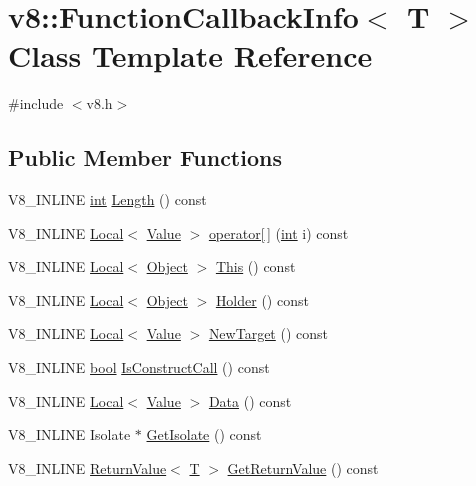 \hypertarget{classv8_1_1FunctionCallbackInfo}{}\section{v8\+:\+:Function\+Callback\+Info$<$ T $>$ Class Template Reference}
\label{classv8_1_1FunctionCallbackInfo}


{\ttfamily \#include $<$v8.\+h$>$}

\subsection*{Public Member Functions}
\begin{DoxyCompactItemize}
\item 
V8\+\_\+\+I\+N\+L\+I\+NE \mbox{\hyperlink{classint}{int}} \mbox{\hyperlink{classv8_1_1FunctionCallbackInfo_af97dd3f1cb01ed039f9479152ad63a84}{Length}} () const
\item 
V8\+\_\+\+I\+N\+L\+I\+NE \mbox{\hyperlink{classv8_1_1Local}{Local}}$<$ \mbox{\hyperlink{classv8_1_1Value}{Value}} $>$ \mbox{\hyperlink{classv8_1_1FunctionCallbackInfo_a77dce5cad7b198c4181a522e9e0ab10f}{operator\mbox{[}$\,$\mbox{]}}} (\mbox{\hyperlink{classint}{int}} i) const
\item 
V8\+\_\+\+I\+N\+L\+I\+NE \mbox{\hyperlink{classv8_1_1Local}{Local}}$<$ \mbox{\hyperlink{classv8_1_1Object}{Object}} $>$ \mbox{\hyperlink{classv8_1_1FunctionCallbackInfo_a4ddfd6d21732dff1c4c55d5441a8a5ca}{This}} () const
\item 
V8\+\_\+\+I\+N\+L\+I\+NE \mbox{\hyperlink{classv8_1_1Local}{Local}}$<$ \mbox{\hyperlink{classv8_1_1Object}{Object}} $>$ \mbox{\hyperlink{classv8_1_1FunctionCallbackInfo_a708ab465862ed796e3b0b3c37ba05044}{Holder}} () const
\item 
V8\+\_\+\+I\+N\+L\+I\+NE \mbox{\hyperlink{classv8_1_1Local}{Local}}$<$ \mbox{\hyperlink{classv8_1_1Value}{Value}} $>$ \mbox{\hyperlink{classv8_1_1FunctionCallbackInfo_aa04f4c5c984db26a90b591f34550e6fa}{New\+Target}} () const
\item 
V8\+\_\+\+I\+N\+L\+I\+NE \mbox{\hyperlink{classbool}{bool}} \mbox{\hyperlink{classv8_1_1FunctionCallbackInfo_ad2105b93e9b4d02f42b7338fa5950cbc}{Is\+Construct\+Call}} () const
\item 
V8\+\_\+\+I\+N\+L\+I\+NE \mbox{\hyperlink{classv8_1_1Local}{Local}}$<$ \mbox{\hyperlink{classv8_1_1Value}{Value}} $>$ \mbox{\hyperlink{classv8_1_1FunctionCallbackInfo_ab0ebfc2ea43af2fdfc3d085272bf499f}{Data}} () const
\item 
V8\+\_\+\+I\+N\+L\+I\+NE Isolate $\ast$ \mbox{\hyperlink{classv8_1_1FunctionCallbackInfo_a7eee713a6f95d5707ce788861754682f}{Get\+Isolate}} () const
\item 
V8\+\_\+\+I\+N\+L\+I\+NE \mbox{\hyperlink{classv8_1_1ReturnValue}{Return\+Value}}$<$ \mbox{\hyperlink{classv8_1_1internal_1_1torque_1_1T}{T}} $>$ \mbox{\hyperlink{classv8_1_1FunctionCallbackInfo_a2cb41afe1e098a46d27d901b4cc1e6f5}{Get\+Return\+Value}} () const
\end{DoxyCompactItemize}
